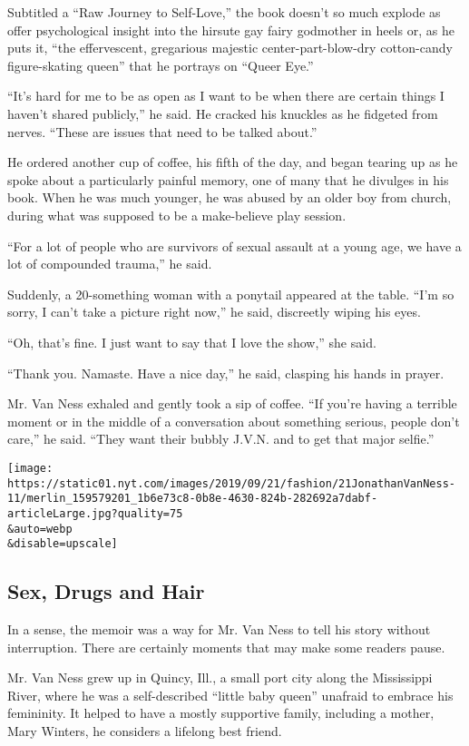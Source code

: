 Subtitled a ``Raw Journey to Self-Love,'' the book doesn't so much
explode as offer psychological insight into the hirsute gay fairy
godmother in heels or, as he puts it, ``the effervescent, gregarious
majestic center-part-blow-dry cotton-candy figure-skating queen'' that
he portrays on ``Queer Eye.''

``It's hard for me to be as open as I want to be when there are certain
things I haven't shared publicly,'' he said. He cracked his knuckles as
he fidgeted from nerves. ``These are issues that need to be talked
about.''

He ordered another cup of coffee, his fifth of the day, and began
tearing up as he spoke about a particularly painful memory, one of many
that he divulges in his book. When he was much younger, he was abused by
an older boy from church, during what was supposed to be a make-believe
play session.

``For a lot of people who are survivors of sexual assault at a young
age, we have a lot of compounded trauma,'' he said.

Suddenly, a 20-something woman with a ponytail appeared at the table.
``I'm so sorry, I can't take a picture right now,'' he said, discreetly
wiping his eyes.

``Oh, that's fine. I just want to say that I love the show,'' she said.

``Thank you. Namaste. Have a nice day,'' he said, clasping his hands in
prayer.

Mr. Van Ness exhaled and gently took a sip of coffee. ``If you're having
a terrible moment or in the middle of a conversation about something
serious, people don't care,'' he said. ``They want their bubbly J.V.N.
and to get that major selfie.''

\texttt{[image: https://static01.nyt.com/images/2019/09/21/fashion/21JonathanVanNess-11/merlin\_159579201\_1b6e73c8-0b8e-4630-824b-282692a7dabf-articleLarge.jpg?quality=75\\\&auto=webp\\\&disable=upscale]}

\hypertarget{sex-drugs-and-hair}{%
\subsection{Sex, Drugs and Hair}\label{sex-drugs-and-hair}}

In a sense, the memoir was a way for Mr. Van Ness to tell his story
without interruption. There are certainly moments that may make some
readers pause.

Mr. Van Ness grew up in Quincy, Ill., a small port city along the
Mississippi River, where he was a self-described ``little baby queen''
unafraid to embrace his femininity. It helped to have a mostly
supportive family, including a mother, Mary Winters, he considers a
lifelong best friend.

